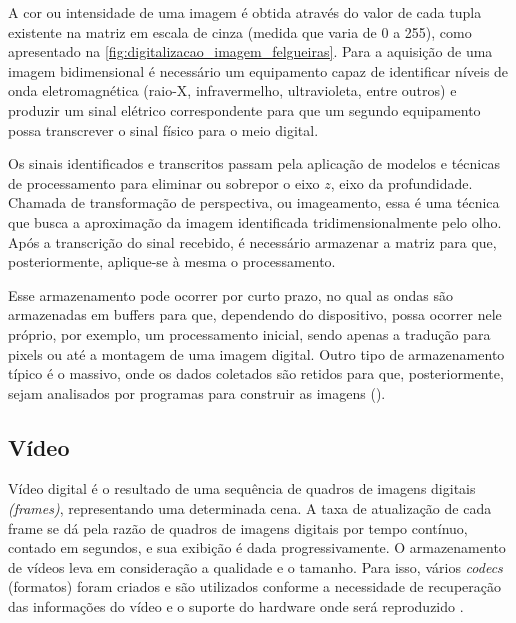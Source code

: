 \documentclass[12pt,oneside,a4paper,chapter=TITLE,section=TITLE,sumario=tradicional]{abntex2}
\begin{document}
A cor ou intensidade de uma imagem é obtida através do valor de cada tupla existente na matriz em escala de cinza (medida que varia de 0 a 255), como apresentado na \autoref{fig:digitalizacao_imagem_felgueiras}. Para a aquisição de uma imagem bidimensional é necessário um equipamento capaz de identificar níveis de onda eletromagnética (raio-X, infravermelho, ultravioleta, entre outros) e produzir um sinal elétrico correspondente para que um segundo equipamento possa transcrever o sinal físico para o meio digital.

\begin{figure}[htb]
\end{figure}

Os sinais identificados e transcritos passam pela aplicação de modelos e técnicas de processamento para eliminar ou sobrepor o eixo $z$, eixo da profundidade. Chamada de transformação de perspectiva, ou imageamento, essa é uma técnica que busca a aproximação da imagem identificada tridimensionalmente pelo olho.
Após a transcrição do sinal recebido, é necessário armazenar a matriz para que, posteriormente, aplique-se à mesma o processamento.

\newline Esse armazenamento pode ocorrer por curto prazo, no qual as ondas são armazenadas em buffers para que, dependendo do dispositivo, possa ocorrer nele próprio, por exemplo, um processamento inicial, sendo apenas a tradução para pixels ou até a montagem de uma imagem digital. Outro tipo de armazenamento típico é o massivo, onde os dados coletados são retidos para que, posteriormente, sejam analisados por programas para construir as imagens ().

\subsection{Vídeo}
Vídeo digital é o resultado de uma sequência de quadros de imagens digitais \textit{(frames)}, representando uma determinada cena. A taxa de atualização de cada frame se dá pela razão de quadros de imagens digitais por tempo contínuo, contado em segundos, e sua exibição é dada progressivamente.
O armazenamento de vídeos leva em consideração a qualidade e o tamanho. Para isso, vários \textit{codecs} (formatos) foram criados e são utilizados conforme a necessidade de recuperação das informações do vídeo e o suporte do hardware onde será reproduzido \cite[p. 6]{de2013arquitetura}.
\end{document}
